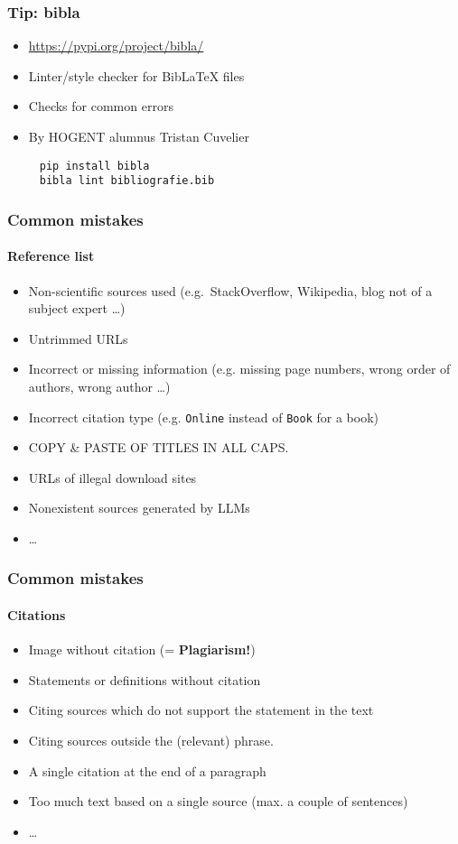 \documentclass[aspectratio=169]{beamer}
\begin{document}
\begin{frame}[fragile]
	\frametitle{Tip: bibla}
	
	\begin{itemize}
		\item \url{https://pypi.org/project/bibla/}
		\item Linter/style checker for BibLaTeX files
		\item Checks for common errors
		\item By HOGENT alumnus Tristan Cuvelier
	\end{itemize}
	\bigskip
	\begin{verbatim}
     pip install bibla
     bibla lint bibliografie.bib
\end{verbatim}
	
\end{frame}

\begin{frame}
  \frametitle{Common mistakes}
  \framesubtitle{Reference list}

  \begin{itemize}
    \item Non-scientific sources used (e.g.\ StackOverflow, Wikipedia, blog not of a subject expert \ldots)
    \item Untrimmed URLs
    \item Incorrect or missing information (e.g. missing page numbers, wrong order of authors, wrong author \ldots)
    \item Incorrect citation type (e.g. \texttt{Online} instead of \texttt{Book} for a book)
    \item COPY \& PASTE OF TITLES IN ALL CAPS.
    \item URLs of illegal download sites
    \item Nonexistent sources generated by LLMs
    \item \ldots
  \end{itemize}
\end{frame}

\begin{frame}
 	\frametitle{Common mistakes}
	\framesubtitle{Citations}

\begin{itemize}
	\item Image without citation (= \textcolor{hgorange}{\textbf{Plagiarism!}})
	\item Statements or definitions without citation
	\item Citing sources which do not support the statement in the text
	\item Citing sources outside the (relevant) phrase.
	\item A single citation at the end of a paragraph
	\item Too much text based on a single source (max. a couple of sentences)
	\item \ldots
\end{itemize}
\end{frame}
\end{document}
